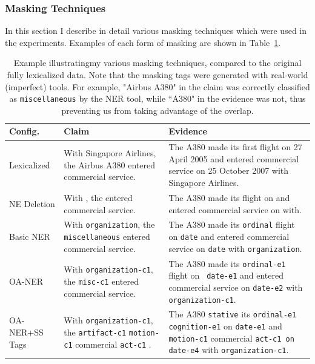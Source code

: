 \documentclass[compsoc,onecolumn]{IEEEtran}
\begin{document}
\subsubsection{Masking Techniques} \label{masking_techniques}
In this section I describe in detail various masking techniques which were used in the experiments. Examples of each form of masking are shown in Table~\ref{masking_examples}.


\begin{table}[t]
\begin{center}
\begin{tabular}{p{20mm}|p{55mm}|p{70mm}}

\textbf{Config.} & \textbf{Claim}& \textbf{Evidence} \\ \hline
Lexicalized & {With Singapore Airlines, the Airbus A380 entered commercial service.} & {The A380 made its first flight on 27 April 2005 and entered commercial service on 25 October 2007 with Singapore Airlines.}\\
\hline 
NE Deletion & {With  , the  entered commercial service.} & {The A380 made its  flight on  and entered commercial service on  with.}\\
\hline 
Basic NER  & {With \texttt{organization}, the \texttt{miscellaneous} entered commercial service.} & {The A380 made its \texttt{ordinal} flight on \texttt{date} and entered commercial service on \texttt{date} with \texttt{organization}.}\\
\hline 
OA-NER  & {With \texttt{organization-c1}, the \texttt{misc-c1} entered commercial service.} & {The A380 made its \texttt{ordinal-e1} flight on \texttt{ date-e1} and entered commercial service on \texttt{date-e2} with \texttt{organization-c1}.}\\
\hline 

\mbox{OA-NER+SS} Tags & {With \texttt{organization-c1}, the \texttt{artifact-c1} \texttt{motion-c1} commercial \texttt{act-c1} .} & {The A380 \texttt{stative} its \texttt{ordinal-e1 cognition-e1} on \texttt{date-e1} and \texttt{motion-c1} commercial \texttt{act-c1 on date-e4} with \texttt{organization-c1}.  
}\\

\end{tabular}
\end{center}

    \caption{ Example illustratingmy various masking techniques, compared to the original fully lexicalized data. Note that the masking tags were generated with real-world (imperfect) tools. For example, "Airbus A380" in the claim was correctly classified as \texttt{miscellaneous} by the NER tool, while ``A380" in the evidence was not, thus preventing us from taking advantage of the overlap. }
    \label{masking_examples}
\end{table}
\end{document}
